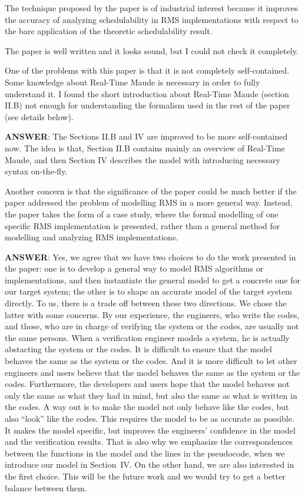 \documentclass[10pt,journal]{IEEEtran}
\newcommand{\ANSWER}{{\bf ANSWER}}
\begin{document}
The technique proposed by the paper is of industrial interest because
it improves the accuracy of analyzing schedulability in RMS
implementations with respect to the bare application of the theoretic
schedulability result.

The paper is well written and it looks sound, but I could not check it
completely.

One of the problems with this paper is that it is not completely
self-contained.  Some knowledge about Real-Time Maude is necessary in
order to fully understand it.  I found the short introduction about
Real-Time Maude (section II.B) not enough for understanding the
formalism used in the rest of the paper (see details below).

\ANSWER: The Sections II.B and IV are improved to be more
self-contained now. The idea is that, Section II.B contains mainly an
overview of Real-Time Maude, and then Section IV describes the model
with introducing necessary syntax on-the-fly.

Another concern is that the significance of the paper could be much
better if the paper addressed the problem of modelling RMS in a more
general way. Instead, the paper takes the form of a case study, where
the formal modelling of one specific RMS implementation is presented,
rather than a general method for modelling and analyzing RMS
implementations.  

\ANSWER: Yes, we agree that we have two choices to do the work
presented in the paper: one is to develop a general way to model RMS
algorithms or implementations, and then instantiate the general model
to get a concrete one for our target system; the other is to shape an
accurate model of the target system directly. To us, there is a trade
off between these two directions. We chose the latter with some
concerns. By our experience, the engineers, who write the codes, and
those, who are in charge of verifying the system or the codes, are
usually not the same persons. When a verification engineer models a
system, he is actually abstacting the system or the codes. It is
difficult to ensure that the model behaves the same as the system or
the codes.  And it is more difficult to let other engineers and users
believe that the model behaves the same as the system or the
codes. Furthermore, the developers and users hope that the model
behaves not only the same as what they had in mind, but also the same
as what is written in the codes. A way out is to make the model not
only behave like the codes, but also ``look'' like the codes. This
requires the model to be as accurate as possible. It makes the model
specific, but improves the engineers' confidence in the model and the
verification results. That is also why we emphasize the
correspondences between the functions in the model and the lines in
the pseudocode, when we introduce our model in Section~IV. On the
other hand, we are also interested in the first choice. This will be
the future work and we would try to get a better balance between them.
\end{document}
